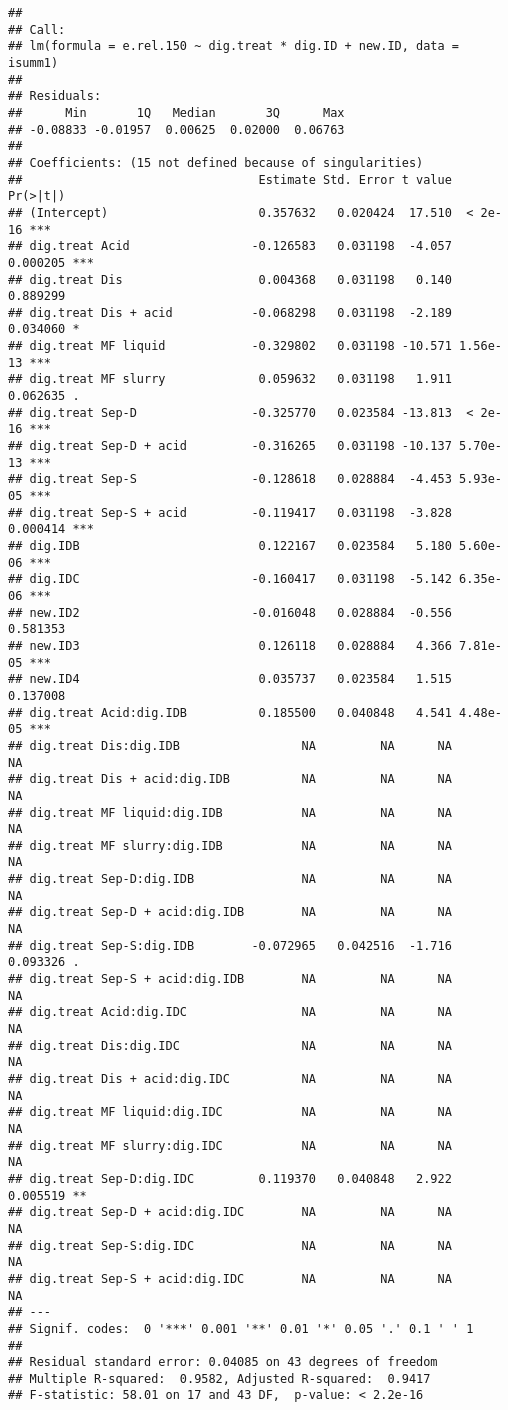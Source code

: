 \documentclass[
]{article}
\begin{document}
\begin{verbatim}
## 
## Call:
## lm(formula = e.rel.150 ~ dig.treat * dig.ID + new.ID, data = isumm1)
## 
## Residuals:
##      Min       1Q   Median       3Q      Max 
## -0.08833 -0.01957  0.00625  0.02000  0.06763 
## 
## Coefficients: (15 not defined because of singularities)
##                                 Estimate Std. Error t value Pr(>|t|)    
## (Intercept)                     0.357632   0.020424  17.510  < 2e-16 ***
## dig.treat Acid                 -0.126583   0.031198  -4.057 0.000205 ***
## dig.treat Dis                   0.004368   0.031198   0.140 0.889299    
## dig.treat Dis + acid           -0.068298   0.031198  -2.189 0.034060 *  
## dig.treat MF liquid            -0.329802   0.031198 -10.571 1.56e-13 ***
## dig.treat MF slurry             0.059632   0.031198   1.911 0.062635 .  
## dig.treat Sep-D                -0.325770   0.023584 -13.813  < 2e-16 ***
## dig.treat Sep-D + acid         -0.316265   0.031198 -10.137 5.70e-13 ***
## dig.treat Sep-S                -0.128618   0.028884  -4.453 5.93e-05 ***
## dig.treat Sep-S + acid         -0.119417   0.031198  -3.828 0.000414 ***
## dig.IDB                         0.122167   0.023584   5.180 5.60e-06 ***
## dig.IDC                        -0.160417   0.031198  -5.142 6.35e-06 ***
## new.ID2                        -0.016048   0.028884  -0.556 0.581353    
## new.ID3                         0.126118   0.028884   4.366 7.81e-05 ***
## new.ID4                         0.035737   0.023584   1.515 0.137008    
## dig.treat Acid:dig.IDB          0.185500   0.040848   4.541 4.48e-05 ***
## dig.treat Dis:dig.IDB                 NA         NA      NA       NA    
## dig.treat Dis + acid:dig.IDB          NA         NA      NA       NA    
## dig.treat MF liquid:dig.IDB           NA         NA      NA       NA    
## dig.treat MF slurry:dig.IDB           NA         NA      NA       NA    
## dig.treat Sep-D:dig.IDB               NA         NA      NA       NA    
## dig.treat Sep-D + acid:dig.IDB        NA         NA      NA       NA    
## dig.treat Sep-S:dig.IDB        -0.072965   0.042516  -1.716 0.093326 .  
## dig.treat Sep-S + acid:dig.IDB        NA         NA      NA       NA    
## dig.treat Acid:dig.IDC                NA         NA      NA       NA    
## dig.treat Dis:dig.IDC                 NA         NA      NA       NA    
## dig.treat Dis + acid:dig.IDC          NA         NA      NA       NA    
## dig.treat MF liquid:dig.IDC           NA         NA      NA       NA    
## dig.treat MF slurry:dig.IDC           NA         NA      NA       NA    
## dig.treat Sep-D:dig.IDC         0.119370   0.040848   2.922 0.005519 ** 
## dig.treat Sep-D + acid:dig.IDC        NA         NA      NA       NA    
## dig.treat Sep-S:dig.IDC               NA         NA      NA       NA    
## dig.treat Sep-S + acid:dig.IDC        NA         NA      NA       NA    
## ---
## Signif. codes:  0 '***' 0.001 '**' 0.01 '*' 0.05 '.' 0.1 ' ' 1
## 
## Residual standard error: 0.04085 on 43 degrees of freedom
## Multiple R-squared:  0.9582, Adjusted R-squared:  0.9417 
## F-statistic: 58.01 on 17 and 43 DF,  p-value: < 2.2e-16
\end{verbatim}
\end{document}
